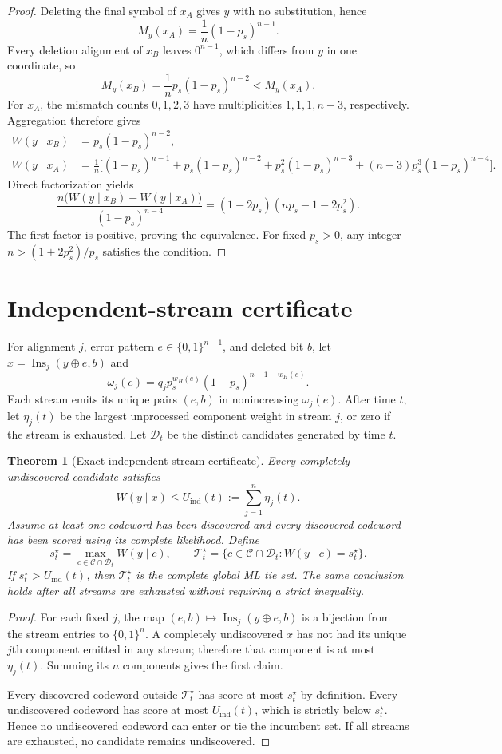 \documentclass[11pt]{article}
\newtheorem{theorem}{Theorem}
\theoremstyle{remark}
\newcommand{\C}{\mathcal C}
\newcommand{\D}{\mathcal D}
\begin{document}
\begin{proof}
Deleting the final symbol of $x_A$ gives $y$ with no substitution, hence
\[
 M_y(x_A)=\frac1n(1-p_s)^{n-1}.
\]
Every deletion alignment of $x_B$ leaves $0^{n-1}$, which differs from $y$ in one
coordinate, so
\[
 M_y(x_B)=\frac1n p_s(1-p_s)^{n-2}<M_y(x_A).
\]
For $x_A$, the mismatch counts $0,1,2,3$ have multiplicities
$1,1,1,n-3$, respectively. Aggregation therefore gives
\begin{align*}
 W(y\mid x_B)&=p_s(1-p_s)^{n-2},\\
 W(y\mid x_A)&=\frac1n\bigl[(1-p_s)^{n-1}
 +p_s(1-p_s)^{n-2}+p_s^2(1-p_s)^{n-3}
 +(n-3)p_s^3(1-p_s)^{n-4}\bigr].
\end{align*}
Direct factorization yields
\[
 \frac{n\bigl(W(y\mid x_B)-W(y\mid x_A)\bigr)}{(1-p_s)^{n-4}}
 =(1-2p_s)(np_s-1-2p_s^2).
\]
The first factor is positive, proving the equivalence. For fixed $p_s>0$, any integer
$n>(1+2p_s^2)/p_s$ satisfies the condition.
\end{proof}

\section{Independent-stream certificate}

For alignment $j$, error pattern $e\in\{0,1\}^{n-1}$, and deleted bit $b$, let
$x=\operatorname{Ins}_j(y\oplus e,b)$ and
\[
 \omega_j(e)=q_jp_s^{w_H(e)}(1-p_s)^{n-1-w_H(e)}.
\]
Each stream emits its unique pairs $(e,b)$ in nonincreasing $\omega_j(e)$. After time
$t$, let $\eta_j(t)$ be the largest unprocessed component weight in stream $j$, or zero
if the stream is exhausted. Let $\D_t$ be the distinct candidates generated by time $t$.

\begin{theorem}[Exact independent-stream certificate]
Every completely undiscovered candidate satisfies
\[
 W(y\mid x)\le U_{\mathrm{ind}}(t):=\sum_{j=1}^{n}\eta_j(t).
\]
Assume at least one codeword has been discovered and every discovered codeword has been
scored using its complete likelihood. Define
\[
 s_t^\star=\max_{c\in\C\cap\D_t}W(y\mid c),\qquad
 \mathcal T_t^\star=\{c\in\C\cap\D_t:W(y\mid c)=s_t^\star\}.
\]
If $s_t^\star>U_{\mathrm{ind}}(t)$, then $\mathcal T_t^\star$ is the complete global ML
tie set. The same conclusion holds after all streams are exhausted without requiring a
strict inequality.
\end{theorem}

\begin{proof}
For each fixed $j$, the map $(e,b)\mapsto\operatorname{Ins}_j(y\oplus e,b)$ is a
bijection from the stream entries to $\{0,1\}^n$. A completely undiscovered $x$ has not
had its unique $j$th component emitted in any stream; therefore that component is at most
$\eta_j(t)$. Summing its $n$ components gives the first claim.

Every discovered codeword outside $\mathcal T_t^\star$ has score at most $s_t^\star$ by
definition. Every undiscovered codeword has score at most $U_{\mathrm{ind}}(t)$, which is
strictly below $s_t^\star$. Hence no undiscovered codeword can enter or tie the incumbent
set. If all streams are exhausted, no candidate remains undiscovered.
\end{proof}
\end{document}
